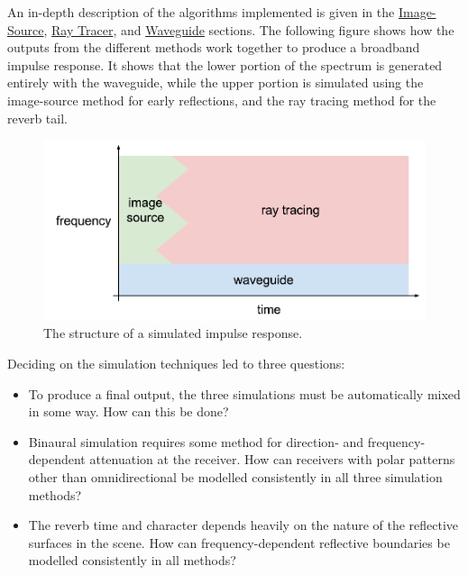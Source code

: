 \documentclass[]{scrreprt}
\providecommand{\tightlist}{%
  \setlength{\itemsep}{0pt}\setlength{\parskip}{0pt}}
\begin{document}
An in-depth description of the algorithms implemented is given in the
\href{\%7B\%7B\%20site.baseurl\%20\%7D\%7D\%7B\%\%20link\%20image_source.md\%20\%\%7D}{Image-Source},
\href{\%7B\%7B\%20site.baseurl\%20\%7D\%7D\%7B\%\%20link\%20ray_tracer.md\%20\%\%7D}{Ray
Tracer}, and
\href{\%7B\%7B\%20site.baseurl\%20\%7D\%7D\%7B\%\%20link\%20waveguide.md\%20\%\%7D}{Waveguide}
sections. The following figure \text{(\ref{fig:regions})} shows how the
outputs from the different methods work together to produce a broadband
impulse response. It shows that the lower portion of the spectrum is
generated entirely with the waveguide, while the upper portion is
simulated using the image-source method for early reflections, and the
ray tracing method for the reverb tail.

\begin{figure}[htbp]
\centering
\includegraphics{images/regions.pdf}
\caption{The structure of a simulated impulse
response.\label{fig:regions}}
\end{figure}

Deciding on the simulation techniques led to three questions:

\begin{itemize}
\tightlist
\item
  To produce a final output, the three simulations must be automatically
  mixed in some way. How can this be done?
\item
  Binaural simulation requires some method for direction- and
  frequency-dependent attenuation at the receiver. How can receivers
  with polar patterns other than omnidirectional be modelled
  consistently in all three simulation methods?
\item
  The reverb time and character depends heavily on the nature of the
  reflective surfaces in the scene. How can frequency-dependent
  reflective boundaries be modelled consistently in all methods?
\end{itemize}
\end{document}
